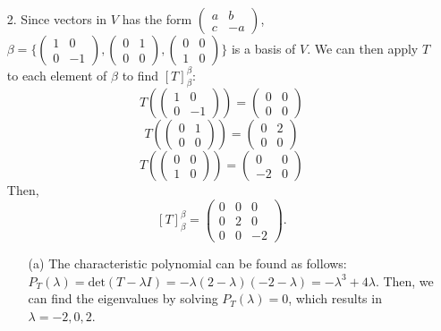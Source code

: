 \documentclass{article}
\begin{document}
\begin{itemize}
    \item [2.] Since vectors in $V$ has the form $\begin{pmatrix}a&b\\c&-a\end{pmatrix}$, $\beta=\{\begin{pmatrix}1&0\\0&-1\end{pmatrix},\begin{pmatrix}0&1\\0&0\end{pmatrix},\begin{pmatrix}0&0\\1&0\end{pmatrix}\}$ is a basis of $V$. We can then apply $T$ to each element of $\beta$ to find $[T]_\beta^\beta$: \[T(\begin{pmatrix}1&0\\0&-1\end{pmatrix})=\begin{pmatrix}0&0\\0&0\end{pmatrix}\]\[T(\begin{pmatrix}0&1\\0&0\end{pmatrix})=\begin{pmatrix}0&2\\0&0\end{pmatrix}\]\[T(\begin{pmatrix}0&0\\1&0\end{pmatrix})=\begin{pmatrix}0&0\\-2&0\end{pmatrix}\] Then, \[[T]_\beta^\beta=\begin{pmatrix}0&0&0\\0&2&0\\0&0&-2\end{pmatrix}.\]
          \begin{itemize}
              \item [(a)] The characteristic polynomial can be found as follows: $P_T(\lambda)=\text{det}(T-\lambda I)=-\lambda(2-\lambda)(-2-\lambda)=-\lambda^3+4\lambda$. Then, we can find the eigenvalues by solving $P_T(\lambda)=0$, which results in $\lambda=-2,0,2$.

\end{itemize}
\end{itemize}
\end{document}
